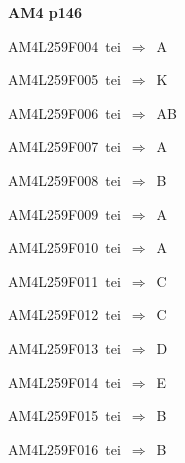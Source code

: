 \par\vfill\eject
{\bf\hfill AM4 p146\hfill\hbox{}}\par\bigskip
{\sixrm AM4L259F004\ {\sixit tei}\ }$\Rightarrow$\ A\par\smallskip
{\sixrm AM4L259F005\ {\sixit tei}\ }$\Rightarrow$\ K\par\smallskip
{\sixrm AM4L259F006\ {\sixit tei}\ }$\Rightarrow$\ AB\par\smallskip
{\sixrm AM4L259F007\ {\sixit tei}\ }$\Rightarrow$\ A\par\smallskip
{\sixrm AM4L259F008\ {\sixit tei}\ }$\Rightarrow$\ B\par\smallskip
{\sixrm AM4L259F009\ {\sixit tei}\ }$\Rightarrow$\ A\par\smallskip
{\sixrm AM4L259F010\ {\sixit tei}\ }$\Rightarrow$\ A\par\smallskip
{\sixrm AM4L259F011\ {\sixit tei}\ }$\Rightarrow$\ C\par\smallskip
{\sixrm AM4L259F012\ {\sixit tei}\ }$\Rightarrow$\ C\par\smallskip
{\sixrm AM4L259F013\ {\sixit tei}\ }$\Rightarrow$\ D\par\smallskip
{\sixrm AM4L259F014\ {\sixit tei}\ }$\Rightarrow$\ E\par\smallskip
{\sixrm AM4L259F015\ {\sixit tei}\ }$\Rightarrow$\ B\par\smallskip
{\sixrm AM4L259F016\ {\sixit tei}\ }$\Rightarrow$\ B\par\smallskip

